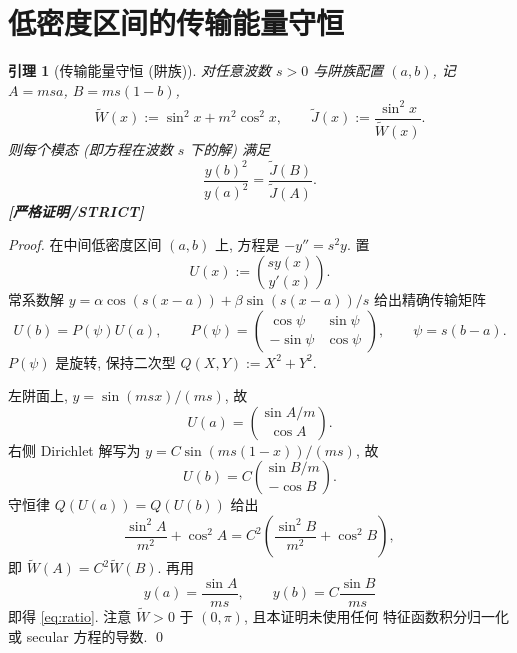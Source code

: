 \documentclass[UTF8]{ctexart}
\newtheorem{lemma}[theorem]{引理}
\newcommand{\STRICT}{\textbf{[严格证明/STRICT]}}
\begin{document}
\section{低密度区间的传输能量守恒}\label{sec:energy}

\begin{lemma}[传输能量守恒 (阱族)]\label{lem:energy}
	对任意波数 $s>0$ 与阱族配置 $(a,b)$, 记 $A=msa$, $B=ms(1-b)$,
	\begin{equation}
		\widetilde W(x):=\sin^2x+m^2\cos^2x,\qquad
		\widetilde J(x):=\frac{\sin^2x}{\widetilde W(x)}.
	\end{equation}
	则每个模态 (即方程在波数 $s$ 下的解) 满足
	\begin{equation}
		\frac{y(b)^2}{y(a)^2}=\frac{\widetilde J(B)}{\widetilde J(A)}.
		\label{eq:ratio}
	\end{equation}
	\STRICT{}
\end{lemma}

\begin{proof}
	在中间低密度区间 $(a,b)$ 上, 方程是 $-y''=s^2y$. 置
	\begin{equation}
		U(x):=\binom{sy(x)}{y'(x)}.
	\end{equation}
	常系数解 $y=\alpha\cos(s(x-a))+\beta\sin(s(x-a))/s$ 给出精确传输矩阵
	\begin{equation}
		U(b)=P(\psi)U(a),\qquad
		P(\psi)=
		\begin{pmatrix}
			\cos\psi & \sin\psi\\
			-\sin\psi & \cos\psi
		\end{pmatrix},\qquad
		\psi=s(b-a).
	\end{equation}
	$P(\psi)$ 是旋转, 保持二次型 $Q(X,Y):=X^2+Y^2$.

	左阱面上, $y=\sin(msx)/(ms)$, 故
	\begin{equation}
		U(a)=\binom{\sin A/m}{\cos A}.
	\end{equation}
	右侧 Dirichlet 解写为 $y=C\sin(ms(1-x))/(ms)$, 故
	\begin{equation}
		U(b)=C\binom{\sin B/m}{-\cos B}.
	\end{equation}
	守恒律 $Q(U(a))=Q(U(b))$ 给出
	\begin{equation}
		\frac{\sin^2A}{m^2}+\cos^2A
		=C^2\left(\frac{\sin^2B}{m^2}+\cos^2B\right),
	\end{equation}
	即 $\widetilde W(A)=C^2\widetilde W(B)$. 再用
	\begin{equation}
		y(a)=\frac{\sin A}{ms},\qquad y(b)=C\frac{\sin B}{ms}
	\end{equation}
	即得 \eqref{eq:ratio}. 注意 $\widetilde W>0$ 于 $(0,\pi)$, 且本证明未使用任何
	特征函数积分归一化或 secular 方程的导数. \qed
\end{proof}
\end{document}
